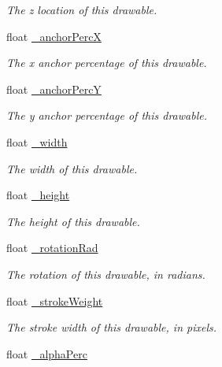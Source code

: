 \begin{DoxyCompactItemize}
\begin{DoxyCompactList}\small\item\em The z location of this drawable. \end{DoxyCompactList}\item 
float \hyperlink{classhype_1_1drawable_1_1_h_drawable_a98b48c17667a22aaa8adfdedbd040661}{\-\_\-anchor\-Perc\-X}
\begin{DoxyCompactList}\small\item\em The x anchor percentage of this drawable. \end{DoxyCompactList}\item 
float \hyperlink{classhype_1_1drawable_1_1_h_drawable_a5b0e557854feedc7e19292bdb28c7739}{\-\_\-anchor\-Perc\-Y}
\begin{DoxyCompactList}\small\item\em The y anchor percentage of this drawable. \end{DoxyCompactList}\item 
float \hyperlink{classhype_1_1drawable_1_1_h_drawable_a3db419b74918a85aee0744fd18aad058}{\-\_\-width}
\begin{DoxyCompactList}\small\item\em The width of this drawable. \end{DoxyCompactList}\item 
float \hyperlink{classhype_1_1drawable_1_1_h_drawable_ad6213a21c5284ead8f127b1da90b9902}{\-\_\-height}
\begin{DoxyCompactList}\small\item\em The height of this drawable. \end{DoxyCompactList}\item 
float \hyperlink{classhype_1_1drawable_1_1_h_drawable_ae9b0ebe09024a9b3b41c8a94b97420af}{\-\_\-rotation\-Rad}
\begin{DoxyCompactList}\small\item\em The rotation of this drawable, in radians. \end{DoxyCompactList}\item 
float \hyperlink{classhype_1_1drawable_1_1_h_drawable_a2acc834533b5ca66f767d766fb6fed58}{\-\_\-stroke\-Weight}
\begin{DoxyCompactList}\small\item\em The stroke width of this drawable, in pixels. \end{DoxyCompactList}\item 
float \hyperlink{classhype_1_1drawable_1_1_h_drawable_a6c87f0a8619c53b4895ea14125ff8996}{\-\_\-alpha\-Perc}

\end{DoxyCompactItemize}
